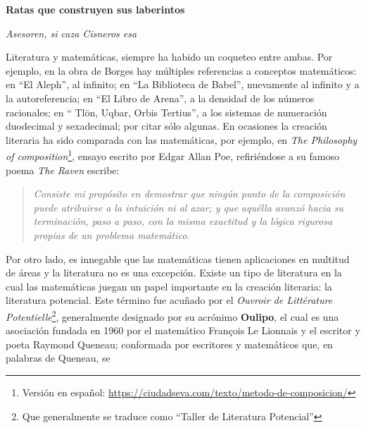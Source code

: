 \documentclass[12pt]{article}
\theoremstyle{definition}
\begin{document}
\thispagestyle{empty}
\begin{center}
\begin{LARGE}\textbf{Ratas que construyen sus laberintos}\end{LARGE}         
\end{center}
\vspace{6pt}

\begin{flushright}
\textit{Asesoren, si caza Cisneros esa}%
\end{flushright}
\vspace{6pt}

Literatura y matemáticas, siempre ha habido un coqueteo entre ambas. Por 
ejemplo, en la obra de Borges hay múltiples referencias a conceptos matemáticos: 
en ``El Aleph'', al infinito; en ``La Biblioteca de Babel'', nuevamente al 
infinito y a la autoreferencia; en ``El Libro de Arena'', a la densidad de los 
números racionales; en `` Tlön, Uqbar, Orbis Tertius'', a los sistemas de 
numeración duodecimal y sexadecimal; por citar sólo algunas. En ocasiones la 
creación literaria ha sido comparada con las matemáticas, por ejemplo, en 
\textit{The Philosophy of composition}\footnote{Versión en español: 
\href{https://ciudadseva.com/texto/metodo-de-composicion/}{
https://ciudadseva.com/texto/metodo-de-composicion/}}, ensayo escrito por 
Edgar Allan Poe, refiriéndose a su famoso poema \textit{The Raven} escribe:
\begin{quotation}
 \textit{Consiste mi propósito en demostrar que ningún punto de la composición 
puede atribuirse a la intuición ni al azar; y que aquélla avanzó hacia su 
terminación, paso a paso, con la misma exactitud y la lógica rigurosa propias de 
un problema matemático.}
\end{quotation}
Por otro lado, es innegable que las matemáticas tienen aplicaciones en multitud 
de áreas y la literatura no es una excepción.
Existe un tipo de literatura en la cual las matemáticas juegan un papel 
importante en la creación literaria: la literatura potencial. Este término fue 
acuñado por el \textit{Ouvroir de Littérature Potentielle}\footnote{Que 
generalmente se traduce como ``Taller de Literatura Potencial''}, generalmente 
designado por su acrónimo \textbf{Oulipo}, el cual es una asociación fundada en 
1960 por el matemático François Le Lionnais y el escritor y poeta Raymond 
Queneau; conformada por escritores y matemáticos que, en palabras de Queneau, se 
\end{document}
